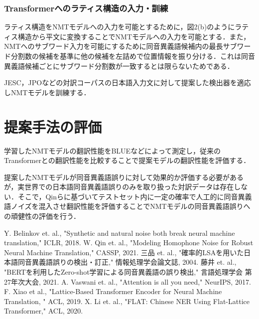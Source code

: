 \documentclass[a4j,10pt, twocolumn]{jarticle} \usepackage[dvipdfmx]{graphicx} \usepackage{amssymb} \usepackage{amsmath}
\begin{document}
\subsubsection{Transformerへのラティス構造の入力・訓練}
ラティス構造をNMTモデルへの入力を可能とするために，図2(b)のようにラティス構造から平文に変換することでNMTモデルへの入力を可能とする．また，NMTへのサブワード入力を可能にするために同音異義語候補内の最長サブワード分割数の候補を基準に他の候補を左詰めで位置情報を振り分ける．これは同音異義語候補ごとにサブワード分割数が一致するとは限らないためである．

JESC，JPOなどの対訳コーパスの日本語入力文に対して提案した検出器を適応しNMTモデルを訓練する．

\section{提案手法の評価}
学習したNMTモデルの翻訳性能をBLUEなどによって測定し，従来のTransformerとの翻訳性能を比較することで提案モデルの翻訳性能を評価する．

提案したNMTモデルが同音異義語誤りに対して効果的か評価する必要があるが，実世界での日本語同音異義語誤りのみを取り扱った対訳データは存在しない．そこで，Qinらに基づいてテストセット内に一定の確率で人工的に同音異義語ノイズを混入させ翻訳性能を評価することでNMTモデルの同音異義語誤りへの頑健性の評価を行う．

\begin{thebibliography}{7}
{\footnotesize
\setlength{\itemsep}{-0.1mm}
Y. Belinkov et. al., "Synthetic and natural noise both break neural machine translation," ICLR, 2018.
W. Qin et. al., "Modeling Homophone Noise for Robust Neural Machine Translation," CASSP, 2021.
三品 et. al., "確率的LSAを用いた日本語同音異義語誤りの検出・訂正," 情報処理学会論文誌, 2004.
藤井 et. al., "BERTを利用したZero-shot学習による同音異義語の誤り検出," 言語処理学会 第27年次大会, 2021.
A. Vaswani et. al., "Attention is all you need," NeurIPS, 2017.
F. Xiao et al., "Lattice-Based Transformer Encoder for Neural Machine Translation, " ACL, 2019.
X. Li et. al., "FLAT: Chinese NER Using Flat-Lattice Transformer," ACL, 2020.
}
\end{thebibliography}
\end{document}
